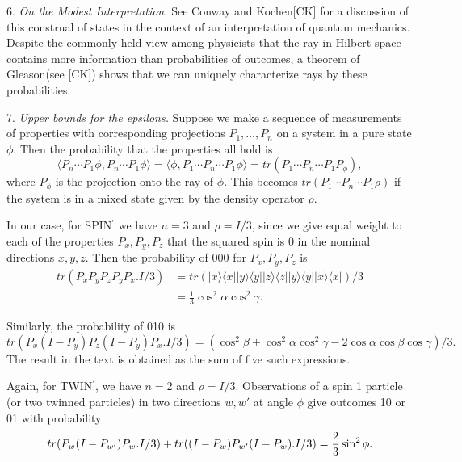 \documentclass[12pt]{amsart}
\begin{document}
6. {\em On the Modest Interpretation.}
See Conway and Kochen[CK] for a discussion of this construal of states in the context of
an interpretation of quantum mechanics.  Despite the commonly held view among 
physicists that the ray in Hilbert space contains more information than
probabilities of outcomes, a theorem of Gleason(see [CK]) shows that we can uniquely
characterize rays by these probabilities.  
  

7.  {\em Upper bounds for the epsilons.}
Suppose we make a sequence of measurements of properties with corresponding 
projections $P_1,\ldots ,P_n$ on a system in a pure state $\phi$. 
Then the probability that the properties
all hold is 
$$
\langle P_n \cdots P_1\phi, P_n \cdots P_1\phi\rangle  = 
      \langle \phi, P_1 \cdots P_n \cdots P_1\phi \rangle = 
            tr(P_1 \cdots P_n \cdots P_1P_\phi),
$$ 
where $P_\phi$ is the projection onto the ray of $\phi$. 
This becomes $tr(P_1 \cdots P_n \cdots P_1 \rho)$ if the system is 
in a mixed state given by the density operator $\rho$.

In our case, for SPIN$^\prime$ we have $n = 3$ and $\rho = I/3$, 
since we give equal weight to each of the properties
$P_x,P_y,P_z$ that the squared spin is $0$ in the nominal 
directions $x,y,z$. Then the probability of $000$ for 
$P_x,P_y,P_z$ is 
$$
\begin{aligned}
tr(P_xP_yP_zP_yP_x.I/3) &= 
     tr(|x\rangle \langle x||y\rangle \langle y||z\rangle 
          \langle z||y\rangle \langle y||x \rangle  \langle x|)/3\\
        &= \frac{1}{3} \cos^2\alpha \cos^2 \gamma .
\end{aligned}
$$

Similarly, the probability of 010 is 
$$
tr(P_x(I-P_y)P_z(I-P_y)P_x.I/3) = 
    (\cos^2\beta +\cos^2\alpha \cos^2\gamma 
       -2\cos\alpha \cos\beta \cos\gamma)/3 .
$$
The result in the text is obtained as the sum of five such expressions.

Again, for TWIN$^\prime$, we have $n = 2$ and $\rho = I/3$. 
Observations of a spin 1 particle
(or two twinned particles) in two directions $w,w'$ 
at angle $\phi$ give outcomes 10 or 01 with probability
$$
tr(P_w(I-P_{w'})P_w.I/3) + tr((I-P_w)P_{w'}(I-P_w).I/3) = 
    \rm{\frac{2}{3}}\sin^2\phi .
$$
\end{document}
